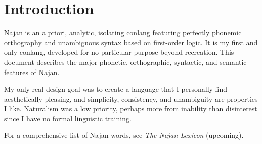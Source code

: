 \section{Introduction}

Najan is an a priori, analytic, isolating conlang featuring perfectly phonemic
orthography and unambiguous syntax based on first-order logic. It is my first
and only conlang, developed for no particular purpose beyond recreation. This
document describes the major phonetic, orthographic, syntactic, and semantic
features of Najan.

My only real design goal was to create a language that I personally find
aesthetically pleasing, and simplicity, consistency, and unambiguity are
properties I like. Naturalism was a low priority, perhaps more from inability
than disinterest since I have no formal linguistic training.

For a comprehensive list of Najan words, see \emph{The Najan Lexicon}
(upcoming).
